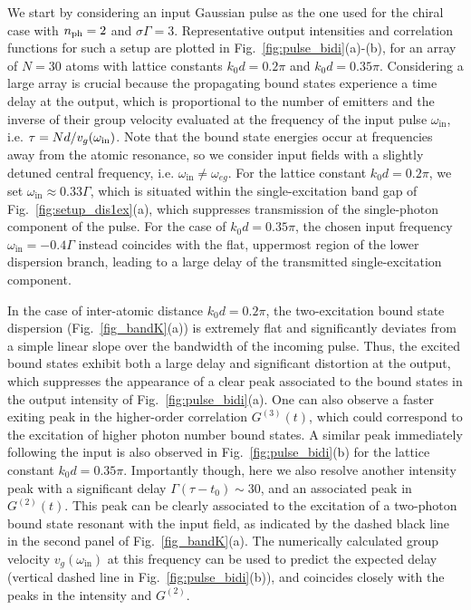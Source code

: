 \documentclass[pra,twocolumn,showpacs,preprintnumbers,amsmath,amssymb]{revtex4-1}
\begin{document}
We start by considering an input Gaussian pulse as the one used for the chiral case with $n_{\rm ph}=2$  and $\sigma\Gamma=3$.
Representative output intensities and correlation functions for such a setup are plotted in Fig.~\ref{fig:pulse_bidi}(a)-(b), for an array of $N=30$ atoms with lattice constants $k_0d=0.2\pi$ and $k_0d=0.35\pi$. Considering a large array is crucial because the propagating bound states experience a time delay at the output, which is proportional to the number of emitters and the inverse of their group velocity evaluated at the frequency of the input pulse $\omega_{\textrm{in}}$, i.e. $\tau=Nd/v_g(\omega_{\rm in})$. 
Note that the bound state energies occur at frequencies away from the atomic resonance, so we consider input fields with a slightly detuned central frequency, i.e. $\omega_{\textrm{in}}\neq \omega_{eg}$. For the lattice constant $k_0d=0.2\pi$, we set $\omega_{\textrm{in}}\approx 0.33\Gamma$, which is situated within the single-excitation band gap of Fig.~\ref{fig:setup_dis1ex}(a), which suppresses transmission of the single-photon component of the pulse. For the case of $k_0d=0.35\pi$, the chosen input frequency $\omega_{\textrm{in}}=-0.4\Gamma$ instead coincides with the flat, uppermost region of the lower dispersion branch, leading to a large delay of the transmitted single-excitation component.


In the case of inter-atomic distance $k_0d=0.2\pi$, the two-excitation bound state dispersion (Fig.~\ref{fig_bandK}(a)) is extremely flat and significantly deviates from a simple linear slope over the bandwidth of the incoming pulse. Thus, the excited bound states exhibit both a large delay and significant distortion at the output, which suppresses the appearance of a clear peak associated to the bound states in the output intensity of Fig.~\ref{fig:pulse_bidi}(a). One can also observe a faster exiting peak in the higher-order correlation $G^{(3)}(t)$, which could correspond to the excitation of higher photon number bound states. A similar peak immediately following the input is also observed in Fig.~\ref{fig:pulse_bidi}(b) for the lattice constant $k_0d=0.35\pi$. Importantly though, here we also resolve another intensity peak with a significant delay $\Gamma(\tau-t_0)\sim 30$, and an associated peak in $G^{(2)}(t)$. This peak can be clearly associated to the excitation of a two-photon bound state resonant with the input field, as indicated by the dashed black line in the second panel of Fig.~\ref{fig_bandK}(a). The numerically calculated group velocity $v_g(\omega_{\textrm{in}})$ at this frequency can be used to predict the expected delay (vertical dashed line in Fig.~\ref{fig:pulse_bidi}(b)), and coincides closely with the peaks in the intensity and $G^{(2)}$. %
\end{document}
